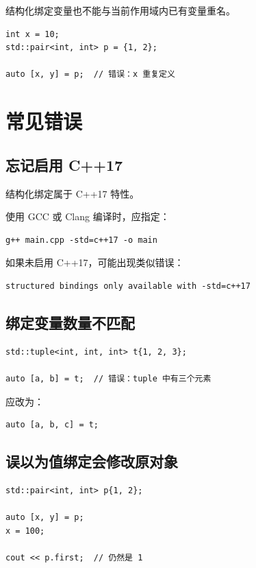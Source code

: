 \documentclass[UTF8,12pt,a4paper]{ctexart}
\begin{document}
结构化绑定变量也不能与当前作用域内已有变量重名。

\begin{lstlisting}
int x = 10;
std::pair<int, int> p = {1, 2};

auto [x, y] = p;  // 错误：x 重复定义
\end{lstlisting}

\section{常见错误}

\subsection{忘记启用 C++17}

结构化绑定属于 C++17 特性。

使用 GCC 或 Clang 编译时，应指定：

\begin{verbatim}
g++ main.cpp -std=c++17 -o main
\end{verbatim}

如果未启用 C++17，可能出现类似错误：

\begin{verbatim}
structured bindings only available with -std=c++17
\end{verbatim}

\subsection{绑定变量数量不匹配}

\begin{lstlisting}
std::tuple<int, int, int> t{1, 2, 3};

auto [a, b] = t;  // 错误：tuple 中有三个元素
\end{lstlisting}

应改为：

\begin{lstlisting}
auto [a, b, c] = t;
\end{lstlisting}

\subsection{误以为值绑定会修改原对象}

\begin{lstlisting}
std::pair<int, int> p{1, 2};

auto [x, y] = p;
x = 100;

cout << p.first;  // 仍然是 1
\end{lstlisting}
\end{document}
